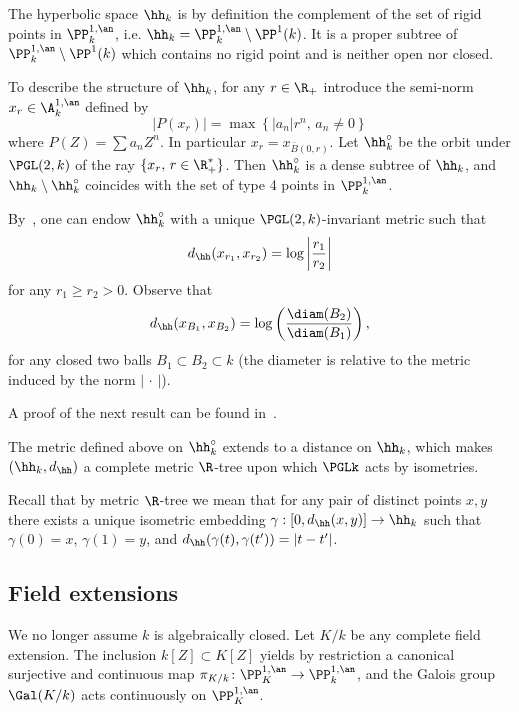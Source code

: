 The hyperbolic space $\hh_k$ is by definition the complement of the set of rigid points in $\PP^{1,\an}_k$, i.e. $\hh_k = \PP^{1,\an}_k \setminus \PP^{1}(k)$. It is a proper subtree of $\PP^{1,\an}_k \setminus \PP^1(k)$ which contains no rigid point and is neither open nor closed.

To describe the structure of $\hh_k$, for any $r\in \R_+$ introduce the semi-norm $x_r\in \A^{1,\an}_k$ defined by
\[
|P(x_r)| = \max \left\{ |a_n| r^n, \, a_n \neq 0 \right\}
\]
where $P(Z) = \sum a_n Z^n$. In particular $x_r = x_{\bar B(0,r)}$. Let $\hh_k^\circ$ be the orbit under $\PGL(2,k)$ of the ray $\{ x_r, \, r\in \R_+^*\}$. Then $\hh_k^\circ$ is a dense subtree of $\hh_k$, and $\hh_k \setminus \hh_k^\circ$ coincides with the set of type 4 points in $\PP^{1,\an}_k$.

By~\cite[Prop.~2.30]{baker-rumely}, one can endow $\hh_k^\circ$ with a unique $\PGL(2,k)$-invariant metric such that
\[
d_{\hh} (x_{r_1}, x_{r_2}) = \log \left|\frac{r_1}{r_2}\right|
\]
for any $r_1\ge r_2 >0$. Observe that
\[
d_{\hh} (x_{B_1}, x_{B_2}) = \log \left(\frac{\diam(B_2)}{\diam(B_1)}\right),
\]
for any closed two balls $B_1 \subset B_2 \subset k$ (the diameter is relative to the metric induced by the norm $|{\,\cdot\,}|$).

A proof of the next result can be found in~\cite[Prop.~2.29]{baker-rumely}.

\begin{lemm}
The metric defined above on $\hh_k^\circ$ extends to a distance on $\hh_k$, which makes $(\hh_k, d_{\hh})$ a complete metric $\R$-tree upon which $\PGLk$ acts by isometries.
\end{lemm}

Recall that by metric $\R$-tree we mean that for any pair of distinct points $x,y$ there exists a unique isometric embedding $\gamma : [0,d_{\hh}(x,y)] \to \hh_k$ such that $\gamma(0) = x$, $\gamma(1) =y$, and $d_{\hh}(\gamma(t), \gamma(t')) = |t -t'|$.

\subsection{Field extensions}\label{subs:field extensions}

We no longer assume $k$ is algebraically closed. Let $K/k$ be any complete field extension. The inclusion $k[Z] \subset K[Z]$ yields by restriction a canonical surjective and continuous map $\pi_{K/k}\colon \PP^{1,\an}_K \to \PP^{1,\an}_k$, and the Galois group $\Gal(K/k)$ acts continuously on $\PP^{1,\an}_K$.

